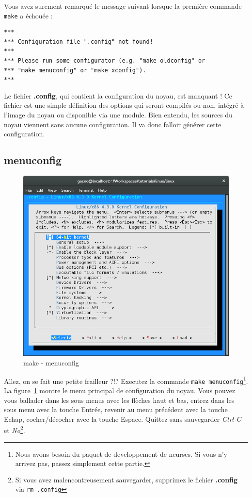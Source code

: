 \documentclass[a4paper]{article}
\begin{document}
Vous avez surement remarqué le message suivant lorsque la première commande \lstset{language=sh}\lstinline{make} a échouée :
\begin{verbatim}
***
*** Configuration file ".config" not found!
***
*** Please run some configurator (e.g. "make oldconfig" or
*** "make menuconfig" or "make xconfig").
***
\end{verbatim}

Le fichier \textbf{.config}, qui contient la configuration du noyau, est manquant ! Ce fichier est une simple définition des options qui seront compilés ou non, intégré à l'image du noyau ou disponible via une module. Bien entendu, les sources du noyau viennent sans aucune configuration. Il va donc falloir générer cette configuration.\\

\subsection{menuconfig}

\begin{figure}
\label{fig:make_menuconfig}
\includegraphics[scale=0.5]{make-menuconfig.png}
\caption{make - menuconfig}
\end{figure}

Allez, on se fait une petite frailleur ?!? Executez la commande \lstinline{make menuconfig}\footnote{Nous avons besoin du paquet de developpement de ncurses. Si vous n'y arrivez pas, passez simplement cette partie.}. La figure~\ref{fig:make_menuconfig} montre le menu principal de configuration du noyau. Vous pouvez vous ballader dans les sous menus avec les flèches haut et bas, entrez dans les sous menu avec la touche Entrée, revenir au menu précédent avec la touche Echap, cocher/décocher avec la touche Espace. Quittez sans sauvegarder \textit{Ctrl-C} et \textit{No}\footnote{Si vous avez malencontreusement sauvegarder, supprimez le fichier \textbf{.config} via \lstset{language=sh}\lstinline{rm .config}}.
\end{document}
